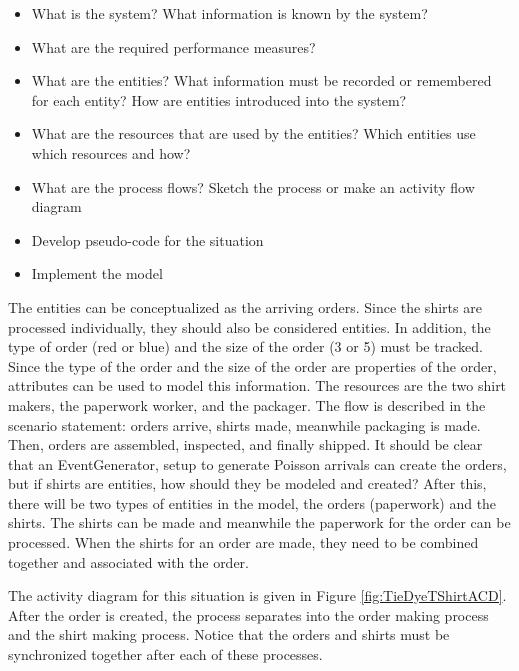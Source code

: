 \documentclass[
]{book}
\theoremstyle{definition}
\theoremstyle{definition}
\theoremstyle{definition}
\theoremstyle{definition}
\theoremstyle{remark}
\begin{document}
\begin{itemize}
\item
  What is the system? What information is known by the system?
\item
  What are the required performance measures?
\item
  What are the entities? What information must be recorded or
  remembered for each entity? How are entities introduced into the
  system?
\item
  What are the resources that are used by the entities? Which entities
  use which resources and how?
\item
  What are the process flows? Sketch the process or make an activity
  flow diagram
\item
  Develop pseudo-code for the situation
\item
  Implement the model
\end{itemize}

The entities can be conceptualized as the arriving orders. Since the
shirts are processed individually, they should also be considered
entities. In addition, the type of order (red or blue) and the size of
the order (3 or 5) must be tracked. Since the type of the order and the
size of the order are properties of the order, attributes can be used to
model this information. The resources are the two shirt makers, the
paperwork worker, and the packager. The flow is described in the
scenario statement: orders arrive, shirts made, meanwhile packaging is
made. Then, orders are assembled, inspected, and finally shipped. It
should be clear that an EventGenerator, setup to generate Poisson
arrivals can create the orders, but if shirts are entities, how should
they be modeled and created? After this, there will be two types of
entities in the model, the orders (paperwork) and the shirts. The shirts
can be made and meanwhile the paperwork for the order can be processed.
When the shirts for an order are made, they need to be combined together
and associated with the order.

The activity diagram for this situation is given in Figure \ref{fig:TieDyeTShirtACD}. After the order is created, the process separates into the order making process and the shirt making
process. Notice that the orders and shirts must be synchronized together
after each of these processes.
\end{document}
